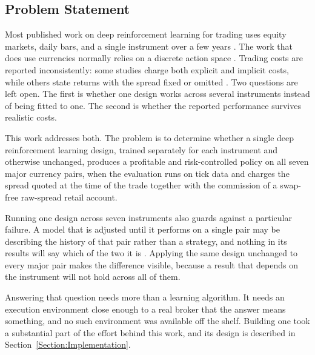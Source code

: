 \subsection{Problem Statement}

Most published work on deep reinforcement learning for trading uses equity markets, daily bars, and a single instrument over a few years \cite{hambly_recent_2023, fischer_reinforcement_2018, alameer_reinforcement_2022}. The work that does use currencies normally relies on a discrete action space \cite{carapuco_reinforcement_2018, huang_financial_2018, rundo_deep_2019}. Trading costs are reported inconsistently: some studies charge both explicit and implicit costs, while others state returns with the spread fixed or omitted \cite{pricope_deep_2021}. Two questions are left open. The first is whether one design works across several instruments instead of being fitted to one. The second is whether the reported performance survives realistic costs.

This work addresses both. The problem is to determine whether a single deep reinforcement learning design, trained separately for each instrument and otherwise unchanged, produces a profitable and risk-controlled policy on all seven major currency pairs, when the evaluation runs on tick data and charges the spread quoted at the time of the trade together with the commission of a swap-free raw-spread retail account.

Running one design across seven instruments also guards against a particular failure. A model that is adjusted until it performs on a single pair may be describing the history of that pair rather than a strategy, and nothing in its results will say which of the two it is \cite{bailey_pseudo-mathematics_2014}. Applying the same design unchanged to every major pair makes the difference visible, because a result that depends on the instrument will not hold across all of them.

Answering that question needs more than a learning algorithm. It needs an execution environment close enough to a real broker that the answer means something, and no such environment was available off the shelf. Building one took a substantial part of the effort behind this work, and its design is described in Section~\ref{Section:Implementation}.